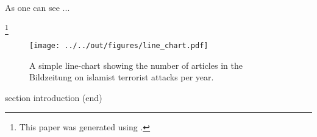 \documentclass[11pt, a4paper, leqno]{article}
\begin{document}
As one can see ...












 \footnote{This paper was generated using \citet{GaudeckerEconProjectTemplates}.}
%

\begin{figure}
   \caption{A simple line-chart showing the number of articles in the Bildzeitung on islamist terrorist attacks per year.}
  
 \texttt{[image: ../../out/figures/line\_chart.pdf]}

\end{figure}


 section introduction (end)




{}





\end{document}
